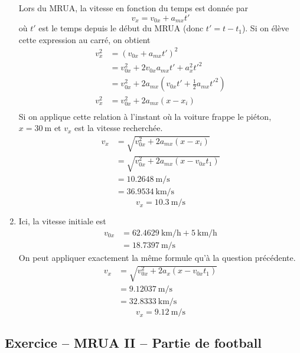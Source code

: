 \begin{enumerate}[a]
    Lors du MRUA, la vitesse en fonction du temps est donnée par
    \[
      v_x = v_{0x} + a_{mx} t'
    \]
    où $t'$ est le temps depuis le début du MRUA (donc $t' = t - t_1$).  Si on
    élève cette expression au carré, on obtient
    \begin{align*}
      v_x^2 &= \left( v_{0x} + a_{mx} t' \right)^2 \\
            &= v_{0x}^2 + 2v_{0x} a_{mx} t' + a_x^2 t'^2 \\
            &= v_{0x}^2 + 2a_{mx}\left(v_{0x} t' + \frac{1}{2} a_{mx} t'^2\right) \\
      v_x^2 &= v_{0x}^2 + 2a_{mx}\left( x - x_i \right) \\
    \end{align*}
    Si on applique cette relation à l'instant où la voiture frappe le piéton,
    $x = \SI{30}{\meter}$ et $v_{x}$ est la vitesse recherchée.
    \begin{align*}
      v_x &= \sqrt{v_{0x}^2 + 2a_{mx}\left( x - x_i \right)} \\
          &= \sqrt{v_{0x}^2 + 2a_{mx}\left( x - v_{0x}t_1 \right)} \\
          &= \SI{10.2648}{\meter\per\second} \\
          &= \SI{36.9534}{\kilo\meter\per\second}
    \end{align*}
    \[
      \boxed{v_x = \SI{10.3}{\meter\per\second}}
    \]


  \item Ici, la vitesse initiale est
    \begin{align*}
      v_{0x} &= \SI{62.4629}{\kilo\meter\per\hour} +
                \SI{5}{\kilo\meter\per\hour} \\
             &= \SI{18.7397}{\meter\per\second}
    \end{align*}
    On peut appliquer exactement la même formule qu'à la question précédente.
    \begin{align*}
      v_x &= \sqrt{v_{0x}^2 + 2a_{x}\left( x - v_{0x}t_1 \right)} \\
          &= \SI{9.12037}{\meter\per\second} \\
          &= \SI{32.8333}{\kilo\meter\per\second}
    \end{align*}
    \[
      \boxed{v_x = \SI{9.12}{\meter\per\second}}
    \]



\end{enumerate}


\subsection{Exercice -- MRUA II -- Partie de football}


